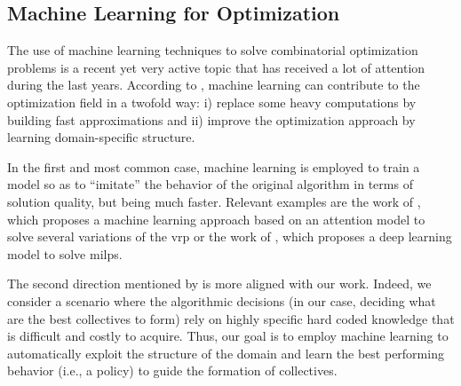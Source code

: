 \documentclass{article}
\theoremstyle{definition}
\newtheorem{definition}{Definition}[section]
\begin{document}
\iffalse
[This part is more suitable in section 3]

In this paper we tackle the problem of formation of collectives as a \gls{wsp} problem \cite{halldorsson2000approximations}, which we deem as sufficiently general to capture all the above considered formalizations and scenarios.
\begin{definition}[Weighted set packing]
Given a set $\mathcal{S}$ of subsets of an universal set $A$ of agents, in which each set $S_i\in\mathcal{S}$ has a corresponding weight $w_i$, find the packing $\mathcal{P} \subseteq \mathcal{S}$ with pairwise disjoint sets that maximizes $\sum_{S_i \in \mathcal{P}} w_i$.
\end{definition}
\fi

\subsection{Machine Learning for Optimization}

The use of machine learning techniques to solve combinatorial optimization problems is a recent yet very active topic that has received a lot of attention during the last years.
According to \cite{bengio2020machine}, machine learning can contribute to the optimization field in a twofold way: i) replace some heavy computations by building fast approximations and ii) improve the optimization approach by learning domain-specific structure.

In the first and most common case, machine learning is employed to train a model so as to ``imitate'' the behavior of the original algorithm in terms of solution quality, but being much faster.
Relevant examples are the work of \cite{kool2018attention}, which proposes a machine learning approach based on an attention model to solve several variations of the \gls{vrp} or the work of \cite{nair2021solving}, which proposes a deep learning model to solve \glspl{milp}.

The second direction mentioned by \cite{bengio2020machine} is more aligned with our work.
Indeed, we consider a scenario where the algorithmic decisions (in our case, deciding what are the best collectives to form) rely on highly specific hard coded knowledge that is difficult and costly to acquire. %
Thus, our goal is to employ machine learning to automatically exploit the structure of the domain and learn the best performing behavior (i.e., a policy) to guide the formation of collectives.
\end{document}
